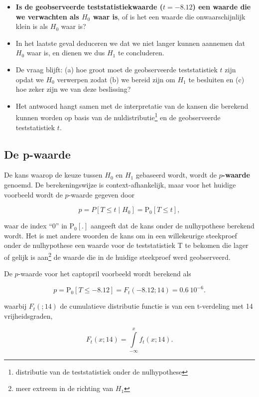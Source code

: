 \documentclass[
  dutch,
  letterpaper,
  12pt]{book}
\providecommand{\tightlist}{%
  \setlength{\itemsep}{0pt}\setlength{\parskip}{0pt}}
\theoremstyle{definition}
\theoremstyle{definition}
\theoremstyle{definition}
\theoremstyle{remark}
\begin{document}
\begin{itemize}
\tightlist
\item
  \textbf{Is de geobserveerde teststatistiekwaarde (\(t=-8.12\)) een
  waarde die we verwachten als \(H_0\) waar is}, of is het een waarde
  die onwaarschijnlijk klein is als \(H_0\) waar is?
\item
  In het laatste geval deduceren we dat we niet langer kunnen aannemen
  dat \(H_0\) waar is, en dienen we dus \(H_1\) te concluderen.
\item
  De vraag blijft: (a) hoe groot moet de geobserveerde teststatistiek
  \(t\) zijn opdat we \(H_0\) verwerpen zodat (b) we bereid zijn om
  \(H_1\) te besluiten en (c) hoe zeker zijn we van deze beslissing?
\item
  Het antwoord hangt samen met de interpretatie van de kansen die
  berekend kunnen worden op basis van de nuldistributie\footnote{distributie
    van de teststatistiek onder de nulhypothese} en de geobserveerde
  teststatistiek \(t\).
\end{itemize}

\subsection{De p-waarde}\label{de-p-waarde}

De kans waarop de keuze tussen \(H_0\) en \(H_1\) gebaseerd wordt, wordt
de \textbf{\(p\)-waarde} genoemd. De berekeningswijze is
context-afhankelijk, maar voor het huidige voorbeeld wordt de
\(p\)-waarde gegeven door

\[
    p = P\left[T \leq t \mid H_0\right] = \text{P}_0\left[T\leq t\right],
  \]

waar de index ``0'' in \(\text{P}_0\left[.\right]\) aangeeft dat de kans
onder de nulhypothese berekend wordt. Het is met andere woorden de kans
om in een willekeurige steekproef onder de nulhypothese een waarde voor
de teststatistiek T te bekomen die lager of gelijk is aan\footnote{meer
  extreem in de richting van \(H_1\)} de waarde die in de huidige
steekproef werd geobserveerd.

De \(p\)-waarde voor het captopril voorbeeld wordt berekend als

\[p= \text{P}_0\left[T\leq -8.12\right]=F_t(-8.12;14) = 0.6\ 10^{-6}.\]

waarbij \(F_t(;14)\) de cumulatieve distributie functie is van een
t-verdeling met 14 vrijheidsgraden,

\[F_t(x;14)=\int\limits_{-\infty}^{x} f_t(x;14).\]
\end{document}
